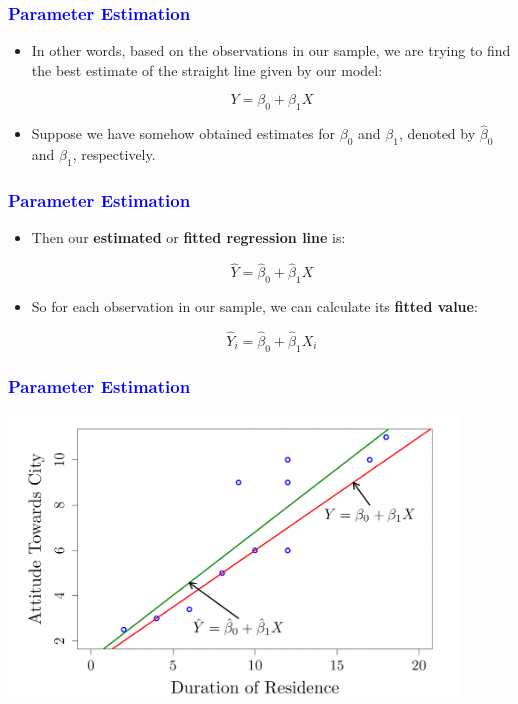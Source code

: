 \documentclass[12pt]{beamer}
\begin{document}
\begin{frame}
	\frametitle{\textcolor{blue}{Parameter Estimation}}
	
	\begin{itemize}[label={\color{blue}$\blacktriangleright$}]
		\item In other words, based on the observations in our sample, we are trying to find the best estimate of the straight line given by our model:
		
		\[
		Y = \beta_0 + \beta_1X
		\]
		
		\item Suppose we have somehow obtained estimates for $\beta_0$ and $\beta_1$, denoted by $\hat{\beta}_0$ and $\hat{\beta}_1$, respectively.
	\end{itemize}
	
\end{frame}
\begin{frame}
	\frametitle{\textcolor{blue}{Parameter Estimation}}
	
	\begin{itemize}[label={\color{blue}$\blacktriangleright$}]
		\item Then our \textbf{estimated} or \textbf{fitted regression line} is:
		
		\[
		\hat{Y} = \hat{\beta}_0 + \hat{\beta}_1X
		\]
		
		\item So for each observation in our sample, we can calculate its \textbf{fitted value}:
		
		\[
		\hat{Y}_i = \hat{\beta}_0 + \hat{\beta}_1X_i
		\]
	\end{itemize}
	
\end{frame}
\begin{frame}
	\frametitle{\textcolor{blue}{Parameter Estimation}}
	\centering
\includegraphics[width=12cm]{para.png}
\end{frame}
\end{document}
